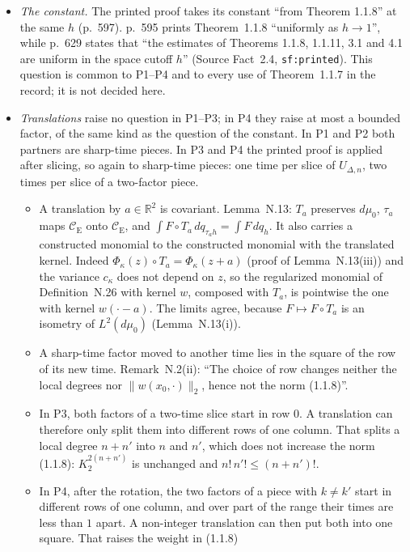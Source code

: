 \documentclass[11pt,a4paper]{article}
\newcommand{\R}{\mathbb{R}}
\newcommand{\CE}{\mathcal{C}_{\mathrm E}}
\newcommand{\dmu}{d\mu_0}
\theoremstyle{plain}
\theoremstyle{definition}
\begin{document}
\begin{itemize}
\item \emph{The constant.}  The printed proof takes its constant ``from Theorem 1.1.8'' at the
same $h$ (p.~597).  p.~595 prints Theorem~1.1.8 ``uniformly as $h\to1$'', while p.~629 states that
``the estimates of Theorems 1.1.8, 1.1.11, 3.1 and 4.1 are uniform in the space cutoff $h$''
(Source Fact~2.4, \texttt{sf:printed}).  This question is common to P1--P4 and to every use of
Theorem~1.1.7 in the record; it is not decided here.
\item \emph{Translations} raise no question in P1--P3; in P4 they raise at most a bounded
factor, of the same kind as the question of the constant.  In P1 and P2 both partners are
sharp-time pieces.  In P3 and P4 the printed proof is applied after slicing, so again to
sharp-time pieces: one time per slice of $U_{\Delta,n}$, two times per slice of a two-factor
piece.
  \begin{itemize}
  \item A translation by $a\in\R^2$ is covariant.  Lemma~N.13: $T_a$ preserves $d\mu_0$, $\tau_a$
  maps $\CE$ onto $\CE$, and $\int F\circ T_a\,dq_{\tau_ah}=\int F\,dq_h$.  It also carries a
  constructed monomial to the constructed monomial with the translated kernel.  Indeed
  $\Phi_\kappa(z)\circ T_a=\Phi_\kappa(z+a)$ (proof of Lemma~N.13(iii)) and the variance
  $c_\kappa$ does not depend on $z$, so the regularized monomial of Definition~N.26 with kernel
  $w$, composed with $T_a$, is pointwise the one with kernel $w(\cdot-a)$.  The limits agree,
  because $F\mapsto F\circ T_a$ is an isometry of $L^2(\dmu)$ (Lemma~N.13(i)).
  \item A sharp-time factor moved to another time lies in the square of the row of its new time.
  Remark~N.2(ii): ``The choice of row changes neither the local degrees nor
  $\|w(x_0,\cdot)\|_2$, hence not the norm (1.1.8)''.
  \item In P3, both factors of a two-time slice start in row $0$.  A translation can therefore
  only split them into different rows of one column.  That splits a local degree $n+n'$ into
  $n$ and $n'$, which does not increase the norm (1.1.8): $K_2^{2(n+n')}$ is unchanged and
  $n!\,n'!\le(n+n')!$.
  \item In P4, after the rotation, the two factors of a piece with $k\ne k'$ start in different
  rows of one column, and over part of the range their times are less than $1$ apart.  A
  non-integer translation can then put both into one square.  That raises the weight in (1.1.8)

\end{itemize}
\end{itemize}
\end{document}
